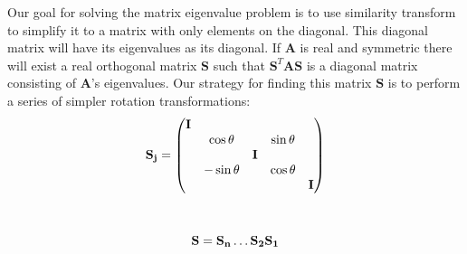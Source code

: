 \documentclass[a4paper]{revtex4}
\begin{document}
Our goal for solving the matrix eigenvalue problem is to use similarity
transform to simplify it to a matrix with only elements on the diagonal. This
diagonal matrix will have its eigenvalues as its diagonal. If $\mathbf{A}$ is
real and symmetric there will exist a real orthogonal matrix $\mathbf{S}$ such
that $\mathbf{S}^T \mathbf{A} \mathbf{S}$ is a diagonal matrix consisting of
$\mathbf{A}$'s eigenvalues. Our strategy for finding this matrix $\mathbf{S}$
is to perform a series of simpler rotation transformations:
\begin{gather}
  \mathbf{S_j} =
  \begin{pmatrix}
    \mathbf{I} &              & \\
    & \cos \theta &  & \sin \theta \\
    & & \mathbf{I} & \\
    & -\sin \theta & & \cos \theta \\
    &&&& \mathbf{I}
  \end{pmatrix} \vspace{1cm} \\
  \mathbf{S} = \mathbf{S_n} \dots \mathbf{S_2} \mathbf{S_1}
\end{gather}
\end{document}
